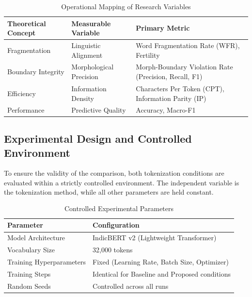 \documentclass[12pt]{article}
\begin{document}
\begin{table}[H]
\centering
\renewcommand{\arraystretch}{1.3}
\begin{tabularx}{\textwidth}{l X X}
\toprule
\textbf{Theoretical Concept} & \textbf{Measurable Variable} & \textbf{Primary Metric} \\
\midrule

Fragmentation 
& Linguistic Alignment 
& Word Fragmentation Rate (WFR), Fertility \\

Boundary Integrity 
& Morphological Precision 
& Morph-Boundary Violation Rate (Precision, Recall, F1) \\

Efficiency 
& Information Density 
& Characters Per Token (CPT), Information Parity (IP) \\

Performance 
& Predictive Quality 
& Accuracy, Macro-F1 \\

\bottomrule
\end{tabularx}
\caption{Operational Mapping of Research Variables}
\label{tab:variables}
\end{table}

\subsection{Experimental Design and Controlled Environment}

To ensure the validity of the comparison, both tokenization conditions are evaluated within a strictly controlled environment. The independent variable is the tokenization method, while all other parameters are held constant.

\begin{table}[H]
\centering
\renewcommand{\arraystretch}{1.3}
\begin{tabularx}{\textwidth}{l X}
\toprule
\textbf{Parameter} & \textbf{Configuration} \\
\midrule

Model Architecture 
& IndicBERT v2 (Lightweight Transformer) \\ \hline

Vocabulary Size 
& 32{,}000 tokens \\ \hline

Training Hyperparameters 
& Fixed (Learning Rate, Batch Size, Optimizer) \\ \hline

Training Steps 
& Identical for Baseline and Proposed conditions \\ \hline

Random Seeds 
& Controlled across all runs \\



\bottomrule
\end{tabularx}
\caption{Controlled Experimental Parameters}
\label{tab:parameters}
\end{table}
\end{document}
